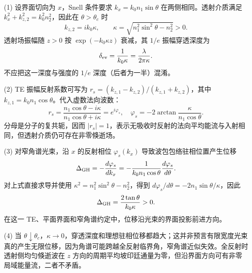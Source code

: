 (1) 设界面切向为 \(x\)，Snell 条件要求 \(k_x=k_0n_1\sin\theta\) 在两侧相同。透射介质满足 \(k_x^2+k_{z,2}^2=k_0^2n_2^2\)，因此在 \(\theta>\theta_c\) 时
\[
k_{z,2}=ik_0\kappa,\qquad
\kappa=\sqrt{n_1^2\sin^2\theta-n_2^2}>0.
\]
透射场振幅随 \(z>0\) 按 \(\exp(-k_0\kappa z)\) 衰减，其 \(1/e\) 振幅穿透深度为
\[
\delta_{\rm ev}=\frac1{k_0\kappa}=\frac{\lambda}{2\pi\kappa}.
\]
不应把这一深度与强度的 \(1/e\) 深度（后者为一半）混淆。

(2) TE 振幅反射系数可写为 \(r_s=(k_{z,1}-k_{z,2})/(k_{z,1}+k_{z,2})\)，其中 \(k_{z,1}=k_0n_1\cos\theta\)。代入虚数法向波数：
\[
r_s=\frac{n_1\cos\theta-i\kappa}{n_1\cos\theta+i\kappa}
=e^{i\varphi_s},
\quad \varphi_s=-2\arctan\frac{\kappa}{n_1\cos\theta}.
\]
分母是分子的复共轭，因而 \(|r_s|=1\)，表示无吸收时反射的法向平均能流与入射相同，但透射介质仍可存在非零倏逝场。

(3) 对窄角谱光束，沿 \(x\) 的反射相位 \(\varphi_s(k_x)\) 导致波包包络驻相位置产生位移
\[
\Delta_{\rm GH}=-\frac{d\varphi_s}{dk_x}
=-\frac{1}{k_0n_1\cos\theta}\frac{d\varphi_s}{d\theta}.
\]
对上式直接求导并使用 \(\kappa^2=n_1^2\sin^2\theta-n_2^2\)，得到 \(d\varphi_s/d\theta=-2n_1\sin\theta/\kappa\)，因此
\[
\Delta_{\rm GH}=\frac{2\tan\theta}{k_0\kappa}>0 .
\]
在这一 TE、平面界面和窄角谱约定中，位移沿光束的界面投影前进方向。

(4) 当 \(\theta\downarrow\theta_c\)，\(\kappa\to0\)，穿透深度和理想驻相位移都趋大；这并非预言有限宽度光束真的产生无限位移，因为角谱可能跨越全反射临界角，窄角谱近似失效。全反射时透射侧均匀倏逝波在 \(z\) 方向的周期平均坡印廷通量为零，但沿界面方向可有非零局域能量流，二者不矛盾。
